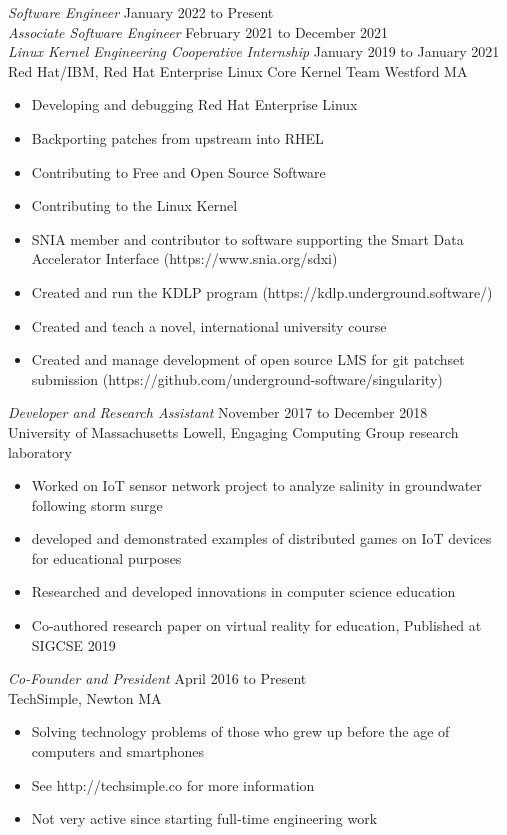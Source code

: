 \documentclass[margin]{res}
\begin{document}
\begin{resume}
{\sl Software Engineer}
\hfill January 2022 to Present \\
{\sl Associate Software Engineer}
\hfill February 2021 to December 2021 \\
{\sl Linux Kernel Engineering Cooperative Internship}
\hfill January 2019 to January 2021\\
Red Hat/IBM, 
Red Hat Enterprise Linux Core Kernel Team Westford MA
\begin{itemize} \itemsep -2pt
	\item Developing and debugging Red Hat Enterprise Linux
        \item Backporting patches from upstream into RHEL
	\item Contributing to Free and Open Source Software
	\item Contributing to the Linux Kernel
        \item SNIA member and contributor to software supporting the Smart Data Accelerator Interface (https://www.snia.org/sdxi)
	\item Created and run the KDLP program (https://kdlp.underground.software/)
        \item Created and teach a novel, international university course
        \item Created and manage development of open source LMS for git patchset submission (https://github.com/underground-software/singularity)
\end{itemize}

{\sl Developer and Research Assistant}
\hfill November 2017 to December 2018 \\
University of Massachusetts Lowell,
Engaging Computing Group research laboratory
\begin{itemize} \itemsep -2pt
	\item Worked on IoT sensor network project to analyze salinity in
		groundwater following storm surge
	\item developed and demonstrated examples of distributed games on
		IoT devices for educational purposes
	\item Researched and developed innovations in computer science
		education
	\item Co-authored research paper on virtual reality for education,
		Published at SIGCSE 2019
\end{itemize} 
{\sl Co-Founder and President}
\hfill April 2016 to Present \\
TechSimple,
Newton MA
\begin{itemize} \itemsep -2pt
	\item Solving technology problems of those who grew up before the age
		of computers and smartphones
	\item See http://techsimple.co for more information
        \item Not very active since starting full-time engineering work
\end{itemize} 

\end{resume}
\end{document}
